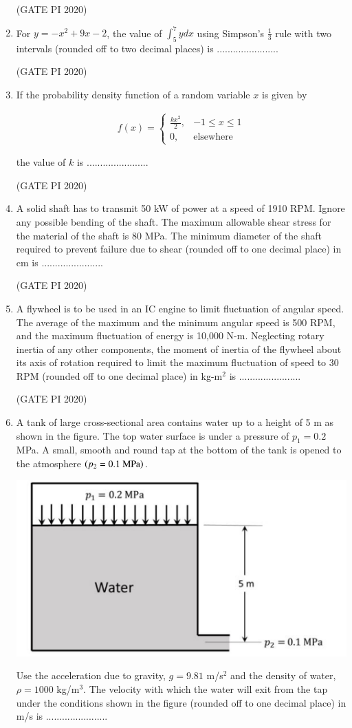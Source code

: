 \documentclass[journal,12pt,onecolumn]{IEEEtran}
\theoremstyle{remark}
\begin{document}
\begin{enumerate}
\hfill (GATE PI 2020)

\item For $y = -x^2 + 9x - 2$, the value of $\int_5^7 ydx$ using Simpson's $\frac{1}{3}$ rule with two intervals (rounded off to two decimal places) is .......................

\hfill (GATE PI 2020)

\item If the probability density function of a random variable $x$ is given by

\begin{align*}
f(x) =
\begin{cases}
\frac{kx^2}{2}, & -1 \leq x \leq 1 \\
0, & \text{elsewhere}
\end{cases}
\end{align*}

the value of $k$ is .......................

\hfill (GATE PI 2020)

\item A solid shaft has to transmit 50 kW of power at a speed of 1910 RPM. Ignore any possible bending of the shaft. The maximum allowable shear stress for the material of the shaft is 80 MPa. The minimum diameter of the shaft required to prevent failure due to shear (rounded off to one decimal place) in cm is .......................

\hfill (GATE PI 2020)

\item A flywheel is to be used in an IC engine to limit fluctuation of angular speed. The average of the maximum and the minimum angular speed is 500 RPM, and the maximum fluctuation of energy is 10,000 N\--m. Neglecting rotary inertia of any other components, the moment of inertia of the flywheel about its axis of rotation required to limit the maximum fluctuation of speed to 30 RPM (rounded off to one decimal place) in kg\--m$^2$ is .......................

\hfill (GATE PI 2020)

\item A tank of large cross-sectional area contains water up to a height of 5 m as shown in the figure. The top water surface is under a pressure of $p_1 = 0.2$ MPa. A small, smooth and round tap at the bottom of the tank is opened to the atmosphere $\left(p_2 = 0.1\text{ MPa}\right)$.\
\begin{center}
\includegraphics[width=0.5\columnwidth]{figs/fig14.png}
\end{center}
Use the acceleration due to gravity, $g = 9.81$ m/s$^2$ and the density of water, $\rho = 1000$ kg/m$^3$. The velocity with which the water will exit from the tap under the conditions shown in the figure (rounded off to one decimal place) in m/s is ....................... 


\end{enumerate}
\end{document}
